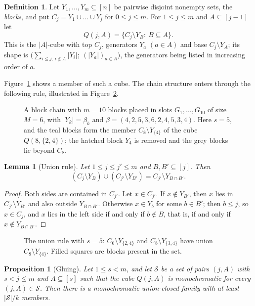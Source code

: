 \documentclass[11pt,reqno]{amsart}
\numberwithin{equation}{section}
\theoremstyle{plain}
\newtheorem{lemma}[theorem]{Lemma}
\newtheorem{proposition}[theorem]{Proposition}
\theoremstyle{definition}
\newtheorem{definition}[theorem]{Definition}
\theoremstyle{remark}
\newcommand{\cS}{\mathcal{S}}
\begin{document}
\begin{definition}
\label{def:chain}
Let $Y_1,\dots,Y_m\subseteq[n]$ be pairwise disjoint nonempty sets, the
\emph{blocks}, and put $C_j=Y_1\cup\dots\cup Y_j$ for $0\le j\le m$. For
$1\le j\le m$ and $A\subseteq[j-1]$ let
\[
Q(j,A)=\{C_j\setminus Y_B:\ B\subseteq A\}.
\]
This is the $|A|$-cube with top $C_j$, generators $Y_a$ $(a\in A)$ and base
$C_j\setminus Y_A$; its shape is
$\bigl(\sum_{i\le j,\,i\notin A}|Y_i|;\ (|Y_a|)_{a\in A}\bigr)$, the
generators being listed in increasing order of $a$.
\end{definition}

Figure~\ref{fig:chain} shows a member of such a cube. The chain
structure enters through the following rule, illustrated in
Figure~\ref{fig:union}.

\begin{figure}[t]
\centering

\caption{A block chain with $m=10$ blocks placed in slots $G_1,\dots,G_{10}$
of size $M=6$, with $|Y_k|=\beta_k$ and
$\beta=(4,2,5,3,6,2,4,5,3,4)$. Here $s=5$, and the teal blocks form the
member $C_8\setminus Y_{\{4\}}$ of the cube $Q(8,\{2,4\})$; the hatched
block $Y_4$ is removed and the grey blocks lie beyond $C_8$.}
\label{fig:chain}
\end{figure}

\begin{lemma}[Union rule]
\label{lem:union}
Let $1\le j\le j'\le m$ and $B,B'\subseteq[j]$. Then
\[
(C_j\setminus Y_B)\cup(C_{j'}\setminus Y_{B'})=C_{j'}\setminus
Y_{B\cap B'} .
\]
\end{lemma}

\begin{proof}
Both sides are contained in $C_{j'}$. Let $x\in C_{j'}$. If $x\notin
Y_{B'}$, then $x$ lies in $C_{j'}\setminus Y_{B'}$ and also outside
$Y_{B\cap B'}$. Otherwise $x\in Y_b$ for some $b\in B'$; then $b\le j$, so
$x\in C_j$, and $x$ lies in the left side if and only if $b\notin B$, that
is, if and only if $x\notin Y_{B\cap B'}$.
\end{proof}

\begin{figure}[t]
\centering

\caption{The union rule with $s=5$: $C_6\setminus Y_{\{2,4\}}$ and
$C_8\setminus Y_{\{3,4\}}$ have union $C_8\setminus Y_{\{4\}}$. Filled
squares are blocks present in the set.}
\label{fig:union}
\end{figure}

\begin{proposition}[Gluing]
\label{prop:glue}
Let $1\le s<m$, and let $\cS$ be a set of pairs $(j,A)$ with $s<j\le m$
and $A\subseteq[s]$ such that the cube $Q(j,A)$ is monochromatic for every
$(j,A)\in\cS$. Then there is a monochromatic union-closed family with at
least $|\cS|/k$ members.
\end{proposition}
\end{document}
